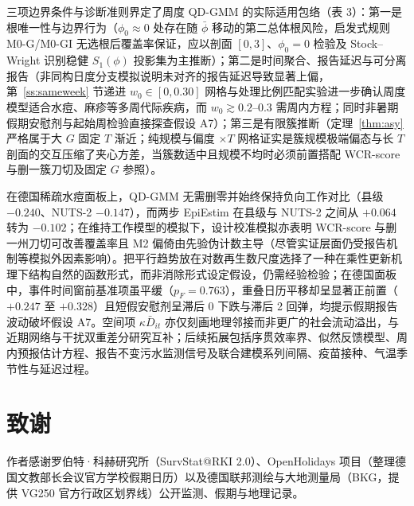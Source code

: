 \documentclass[11pt,a4paper]{ctexart}
\theoremstyle{definition}
\begin{document}
三项边界条件与诊断准则界定了周度 QD-GMM 的实际适用包络（表 3）：第一是根唯一性与边界行为（$\phi_0\approx 0$ 处存在随 $\bar\phi$ 移动的第二总体根风险，启发式规则 M0-G/M0-GI 无选根后覆盖率保证，应以剖面 $[0,3]$、$\phi_0=0$ 检验及 Stock--Wright 识别稳健 $S_1(\phi)$ 投影集为主推断\citealp{stock2000weak,andrews2017subvector,cox2026simple}）；第二是时间聚合、报告延迟与可分离报告（非同构日度分支模拟说明未对齐的报告延迟导致显著上偏，第~\ref{ss:sameweek} 节递进 $w_0\in[0,0.30]$ 网格与处理比例匹配实验进一步确认周度模型适合水痘、麻疹等多周代际疾病，而 $w_0\gtrsim 0.2$--$0.3$ 需周内方程\citealp{lison2024nowcast}；同时非暑期假期安慰剂与起始周检验直接探查假设 A7）；第三是有限簇推断（定理~\ref{thm:asy} 严格属于大 $G$ 固定 $T$ 渐近；纯规模与偏度 $\times T$ 网格证实是簇规模极端偏态与长 $T$ 剖面的交互压缩了夹心方差，当簇数适中且规模不均时必须前置搭配 WCR-score 与删一簇刀切及固定 $G$ 参照\citealp{cameron2008bootstrap,kline2012score,webb2023reworking,mackinnon2023jackknife,hwang2021simple,ferman2019inference,canay2021wild}）。

在德国稀疏水痘面板上，QD-GMM 无需删零并始终保持负向工作对比（县级 $-0.240$、NUTS-2 $-0.147$），而两步 EpiEstim 在县级与 NUTS-2 之间从 $+0.064$ 转为 $-0.102$；在维持工作模型的模拟下，设计校准模拟亦表明 WCR-score 与删一州刀切可改善覆盖率且 M2 偏倚由先验伪计数主导（尽管实证层面仍受报告机制等模拟外因素影响）。把平行趋势放在对数再生数尺度选择了一种在乘性更新机理下结构自然的函数形式，而非消除形式设定假设\citep{roth2023parallel}，仍需经验检验；在德国面板中，事件时间窗前基准项虽平缓（$p_F=0.763$），重叠日历平移却呈显著正前置（$+0.247$ 至 $+0.328$）且短假安慰剂呈滞后 0 下跌与滞后 2 回弹，均提示假期报告波动破坏假设 A7。空间项 $\kappa\bar D_{it}$ 亦仅刻画地理邻接而非更广的社会流动溢出\citep{zhao2021interdependent}，与近期网络与干扰双重差分研究互补\citep{elenev2025staggered,hettinger2025doubly,xu2023did,xu2026dynamic,callaway2023pandemic}；后续拓展包括序贯效率界\citep{chamberlain1992sequential,chamberlain2022feedback}、似然反馈模型\citep{bonhomme2025feedback}、周内预报估计方程、报告不变污水监测信号\citep{goldstein2024wastewater}及联合建模系列间隔、疫苗接种、气温季节性与延迟过程\citep{siedler2010varicella,rieck2020impfquoten,suzuki2023varicella,trevisin2023spatially,goldwasser2026rt}。

\section*{致谢}
作者感谢罗伯特·科赫研究所（SurvStat@RKI 2.0）、OpenHolidays 项目（整理德国文教部长会议官方学校假期日历）以及德国联邦测绘与大地测量局（BKG，提供 VG250 官方行政区划界线）公开监测、假期与地理记录。
\end{document}
